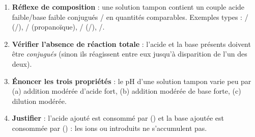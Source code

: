 \documentclass[11pt]{article}
\newcommand{\cle}[1]{{\popxbold\color{popdark}#1}}
\begin{document}
\begin{methode}
\begin{enumerate}
\item \textbf{Réflexe de composition} : une solution tampon contient un couple acide faible/base faible conjugués / en quantités \cle{comparables}. Exemples types : 
/ (/), 
/ (propanoïque), 
/ (/), /.
\item \textbf{Vérifier l'absence de réaction totale} : l'acide et la base présents doivent être \emph{conjugués} (sinon ils réagissent entre eux jusqu'à disparition de l'un des deux).
\item \textbf{Énoncer les trois propriétés} : le pH d'une solution tampon varie \cle{peu} par (a) addition modérée d'acide fort, (b) addition modérée de base forte, (c) dilution modérée.
\item \textbf{Justifier} : l'acide ajouté est consommé par  () et la base ajoutée est consommée par  () : les ions  ou  introduits ne s'accumulent pas.
\end{enumerate}
\end{methode}
\end{document}
